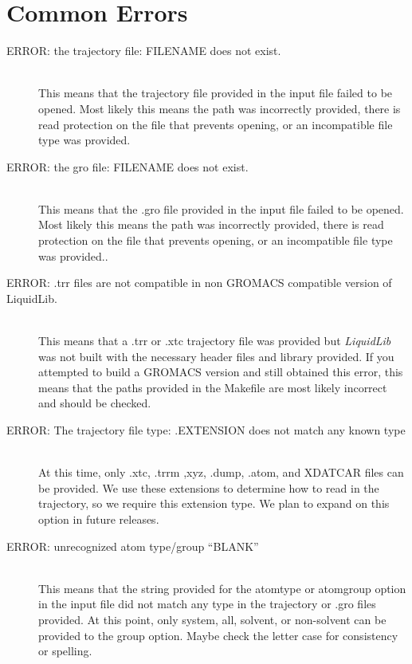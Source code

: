 \documentclass{article}
\begin{document}
\section{Common Errors} \label{sec::errors}
\begin{description}		
	\item[ERROR: the trajectory file: FILENAME does not exist.] \hfill \\
	This means that the trajectory file provided in the input file failed to be opened.  Most likely this means the path was incorrectly provided, there is read protection on the file that prevents opening, or an incompatible file type was provided.
	
	\item[ERROR: the gro file: FILENAME does not exist.] \hfill \\
	This means that the .gro file provided in the input file failed to be opened.  Most likely this means the path was incorrectly provided, there is read protection on the file that prevents opening, or an incompatible file type was provided..
	
	\item[ERROR: .trr files are not compatible in non GROMACS compatible version of LiquidLib.] \hfill \\
	This means that a .trr or .xtc trajectory file was provided but \textit{LiquidLib} was not built with the necessary header files and library provided.  If you attempted to build a GROMACS version and still obtained this error, this means that the paths provided in the Makefile are most likely incorrect and should be checked.
	
	\item[ERROR: The trajectory file type: .EXTENSION does not match any known type] \hfill \\
	At this time, only .xtc, .trrm ,xyz, .dump, .atom, and XDATCAR files can be provided.  We use these extensions to determine how to read in the trajectory, so we require this extension type.  We plan to expand on this option in future releases.
	
	\item[ERROR: unrecognized atom type/group ``BLANK''] \hfill \\
	This means that the string provided for the atomtype or atomgroup option in the input file did not match any type in the trajectory or .gro files provided.  At this point, only system, all, solvent, or non-solvent can be provided to the group option.  Maybe check the letter case for consistency or spelling.
	

\end{description}
\end{document}
